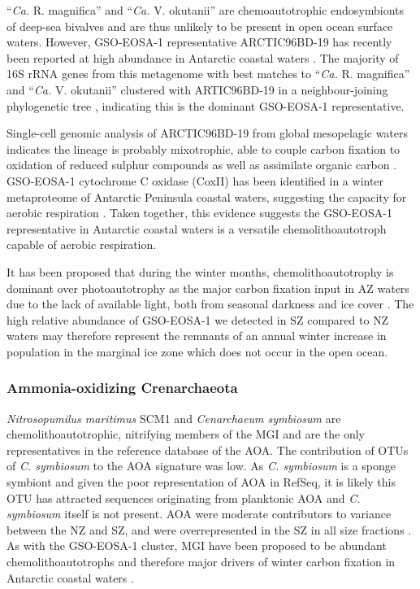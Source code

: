 ``\emph{Ca.} R. magnifica'' and ``\emph{Ca.} V. okutanii'' are chemoautotrophic endosymbionts of deep-sea bivalves \cite{Kuwahara:2007gf,Newton:2007fu} and are thus unlikely to be present in open ocean surface waters. 
However, GSO-EOSA-1 representative ARCTIC96BD-19 has recently been reported at high abundance in Antarctic coastal waters \cite{Ghiglione:2011ee,Grzymski:2012ej}.
The majority of 16S rRNA genes from this metagenome with best  matches to ``\emph{Ca.} R. magnifica'' and ``\emph{Ca.} V. okutanii'' clustered with ARTIC96BD-19 in a neighbour-joining phylogenetic tree , indicating this is the dominant GSO-EOSA-1 representative. 

Single-cell genomic analysis of ARCTIC96BD-19 from global mesopelagic waters indicates the lineage is probably mixotrophic, able to couple carbon fixation to oxidation of reduced sulphur compounds as well as assimilate organic carbon \cite{Swan:2011hb}.
GSO-EOSA-1 cytochrome C oxidase (CoxII) has been identified in a winter metaproteome of Antarctic Peninsula coastal waters, suggesting the capacity for aerobic respiration \cite{Williams:2012bs}.
Taken together, this evidence suggests the GSO-EOSA-1 representative in Antarctic coastal waters is a versatile chemolithoautotroph capable of aerobic respiration.

It has been proposed that during the winter months, chemolithoautotrophy is dominant over photoautotrophy as the major carbon fixation input in \ac{AZ} waters due to the lack of available light, both from seasonal darkness and ice cover \cite{Grzymski:2012ej}.
The high relative abundance of GSO-EOSA-1 we detected in \ac{SZ} compared to \ac{NZ} waters may therefore represent the remnants of an annual winter increase in population in the marginal ice zone which does not occur in the open ocean.

\subsubsection{Ammonia-oxidizing Crenarchaeota}

\emph{Nitrosopumilus maritimus} SCM1 and \emph{Cenarchaeum symbiosum} are chemolithoautotrophic, nitrifying members of the \ac{MGI} \cite{Preston:1996vi,Walker:2010ww} and are the only representatives in the reference database of the \ac{AOA}.
The contribution of \acp{OTU} of \emph{C. symbiosum} to the \ac{AOA} signature was low.
As \emph{C. symbiosum} is a sponge symbiont \cite{Preston:1996vi} and given the poor representation of \ac{AOA} in RefSeq, it is likely this \ac{OTU} has attracted sequences originating from planktonic \ac{AOA} and \emph{C. symbiosum} itself is not present.
\ac{AOA} were moderate contributors to variance between the \ac{NZ} and \ac{SZ}, and were overrepresented in the \ac{SZ} in all size fractions .
As with the GSO-EOSA-1 cluster, \ac{MGI} have been proposed to be abundant chemolithoautotrophs and therefore major drivers of winter carbon fixation in Antarctic coastal waters \cite{Grzymski:2012ej,Williams:2012bs}.

